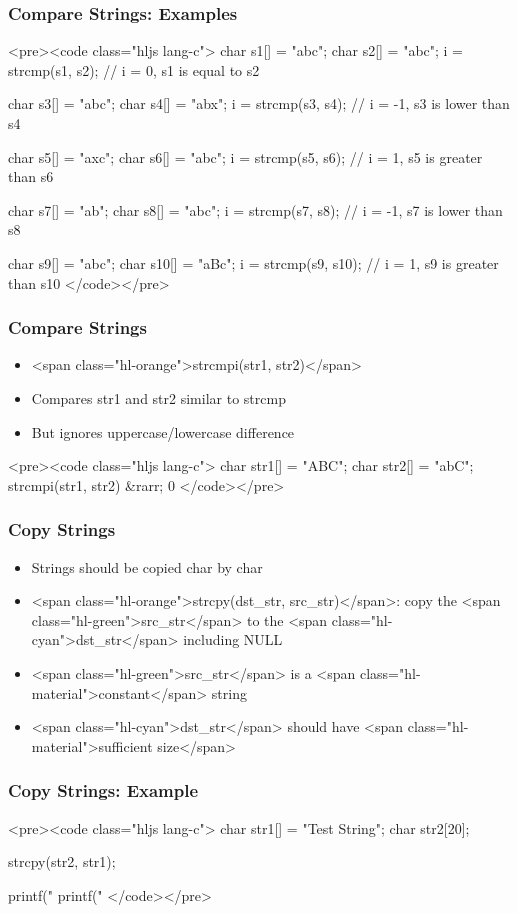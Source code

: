 \documentclass{../c-lecture}
\begin{document}
\begin{frame}
  \frametitle{Compare Strings: Examples}
  <pre><code class="hljs lang-c">
char s1[] = "abc";
char s2[] = "abc";
i = strcmp(s1, s2); // i = 0, s1 is equal to s2

char s3[] = "abc";
char s4[] = "abx";
i = strcmp(s3, s4); // i = -1, s3 is lower than s4

char s5[] = "axc";
char s6[] = "abc";
i = strcmp(s5, s6); // i = 1, s5 is greater than s6

char s7[] = "ab";
char s8[] = "abc";
i = strcmp(s7, s8); // i = -1, s7 is lower than s8

char s9[] = "abc";
char s10[] = "aBc";
i = strcmp(s9, s10); // i = 1, s9 is greater than s10
  </code></pre>
\end{frame}
\begin{frame}
  \frametitle{Compare Strings}
  \begin{itemize}
    \item <span class="hl-orange">strcmpi(str1, str2)</span>
    \item Compares str1 and str2 similar to strcmp
    \item But ignores uppercase/lowercase difference
  \end{itemize}
  <pre><code class="hljs lang-c">
char str1[] = "ABC";
char str2[] = "abC";
strcmpi(str1, str2) &rarr; 0
  </code></pre>
\end{frame}
\begin{frame}
  \frametitle{Copy Strings}
  \begin{itemize}
    \item Strings should be copied char by char
    \item
      <span class="hl-orange">strcpy(dst_str, src_str)</span>: copy the
      <span class="hl-green">src_str</span> to the
      <span class="hl-cyan">dst_str</span> including NULL

    \item
      <span class="hl-green">src_str</span> is a
      <span class="hl-material">constant</span> string

    \item
      <span class="hl-cyan">dst_str</span> should have
      <span class="hl-material">sufficient size</span>

  \end{itemize}
\end{frame}
\begin{frame}
  \frametitle{Copy Strings: Example}
  <pre><code class="hljs lang-c">
char str1[] = "Test String";
char str2[20];

strcpy(str2, str1);

printf("%
printf("%
  </code></pre>
\end{frame}
\end{document}
